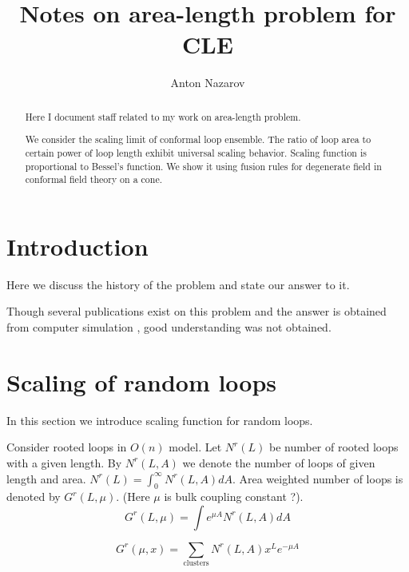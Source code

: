 \documentclass[12pt]{article}
\begin{document}
\title{Notes on area-length problem for CLE}
\author{Anton Nazarov}%

\maketitle

\begin{abstract}
  Here I document staff related to my work on area-length problem.

  We consider the scaling limit of conformal loop ensemble. The ratio
  of loop area to certain power of loop length exhibit universal
  scaling behavior. Scaling function is proportional to Bessel's
  function. We show it using fusion rules for degenerate field in
  conformal field theory on a cone. 
\end{abstract}

\section{Introduction}
\label{sec:introduction}

Here we discuss the history of the problem and state our answer to it. 

Though several publications exist
\cite{cardy2003exact,cardy2003crossover,cardy2001exact,cardy1994geometrical}
on this problem and the answer is
obtained from computer simulation \cite{richard2001scaling}, good understanding was not
obtained. 

\section{Scaling of random loops}
\label{sec:scaling-random-loops}

In this section we introduce scaling function for random loops. 

Consider rooted loops in $O(n)$ model. Let $N^r(L)$ be number of
rooted loops with a given length.  By $N^r(L,A)$ we denote the number
of loops of given length and area. $N^r(L)=\int_0^{\infty} N^r(L,A)
dA$. Area weighted number of loops is denoted by $G^r(L,\mu)$. (Here
$\mu$ is bulk coupling constant ?).
\begin{equation}
  \label{eq:2}
  G^r(L,\mu)=\int e^{\mu A} N^r(L,A) dA
\end{equation}

\begin{equation}
  \label{eq:1}
  G^r (\mu,x) = \sum_{\mathrm{clusters}} N^r (L,A) x^L e^{-\mu A}
\end{equation}
\end{document}
